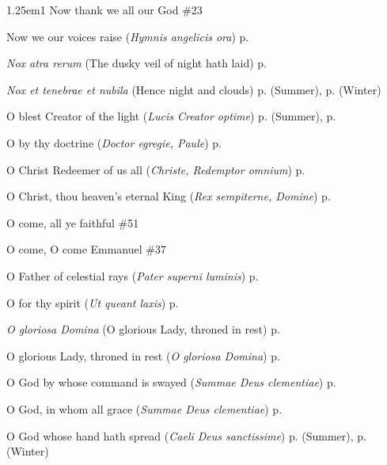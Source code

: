 \begin{hangparas}{1.25em}{1}
Now thank we all our God \dotfill \#23
\par\noindent
Now we our voices raise (\textit{Hymnis angelicis ora}) \dotfill p. \pageref{ScholasticaInvitatory}
\par\noindent
\textit{Nox atra rerum} (The dusky veil of night hath laid) \dotfill p. \pageref{ThursdayInvitatory}
\par\noindent
\textit{Nox et tenebrae et nubila} (Hence night and clouds) \dotfill p. \pageref{WednesdayMattinsSummer} (Summer), p. \pageref{WednesdayMattinsWinter} (Winter)
\par\noindent
O blest Creator of the light (\textit{Lucis Creator optime}) \dotfill p. \pageref{SundayEvensongSummer} (Summer), p. \pageref{SundayEvensongWinter}
\par\noindent
O by thy doctrine (\textit{Doctor egregie, Paule}) \dotfill p. \pageref{PaulEvensong}
\par\noindent
O Christ Redeemer of us all (\textit{Christe, Redemptor omnium}) \dotfill p. \pageref{AllHallowsEvensong}
\par\noindent
O Christ, thou heaven's eternal King (\textit{Rex sempiterne, Domine}) \dotfill p. \pageref{EasterDayInvitatory}
\par\noindent
O come, all ye faithful \dotfill \#51
\par\noindent
O come, O come Emmanuel \dotfill \#37
\par\noindent
O Father of celestial rays (\textit{Pater superni luminis}) \dotfill p. \pageref{MaryMagdaleneEvensong}
\par\noindent
O for thy spirit (\textit{Ut queant laxis}) \dotfill p. \pageref{JohnBaptistEvensong}
\par\noindent
\textit{O gloriosa Domina} (O glorious Lady, throned in rest) \dotfill p. \pageref{BVMMattins}
\par\noindent
O glorious Lady, throned in rest (\textit{O gloriosa Domina}) \dotfill p. \pageref{BVMMattins}
\par\noindent
O God by whose command is swayed (\textit{Summae Deus clementiae}) \dotfill p. \pageref{TrinityInvitatory}
\par\noindent
O God, in whom all grace (\textit{Summae Deus clementiae}) \dotfill p. \pageref{SevenSorrowsMattins}
\par\noindent
O God whose hand hath spread (\textit{Caeli Deus sanctissime}) \dotfill p. \pageref{WednesdayEvensongSummer} (Summer), p. \pageref{WednesdayEvensongWinter} (Winter)
\par\noindent

\end{hangparas}
